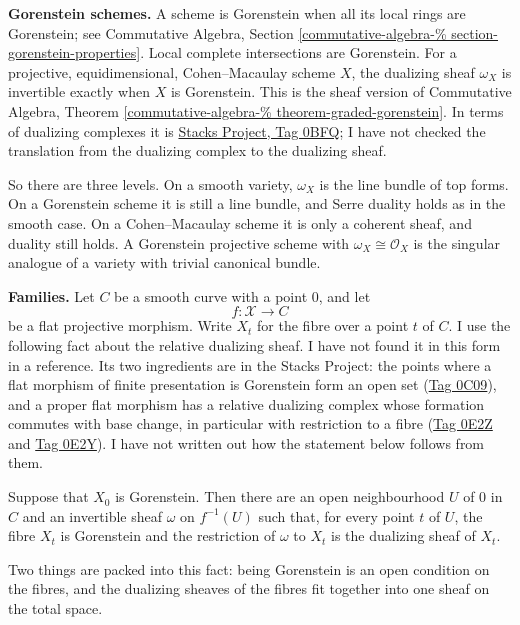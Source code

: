 \medskip\noindent
{\bf Gorenstein schemes.}
A scheme is Gorenstein when all its local
rings are Gorenstein; see Commutative
Algebra, Section
\ref{commutative-algebra-%
section-gorenstein-properties}. Local
complete intersections are Gorenstein.
For a projective, equidimensional,
Cohen--Macaulay scheme $X$, the dualizing
sheaf $\omega_X$ is invertible exactly
when $X$ is Gorenstein. This is the sheaf
version of Commutative Algebra, Theorem
\ref{commutative-algebra-%
theorem-graded-gorenstein}. In terms of
dualizing complexes it is
\href{https://stacks.math.columbia.edu/tag/0BFQ}
{Stacks Project, Tag 0BFQ}; I have not
checked the translation from the dualizing
complex to the dualizing sheaf.

So there are three levels. On a smooth
variety, $\omega_X$ is the line bundle of
top forms. On a Gorenstein scheme it is
still a line bundle, and Serre duality
holds as in the smooth case. On a
Cohen--Macaulay scheme it is only a
coherent sheaf, and duality still holds.
A Gorenstein projective scheme with
$\omega_X\cong\mathcal{O}_X$ is the
singular analogue of a variety with
trivial canonical bundle.

\medskip\noindent
{\bf Families.}
Let $C$ be a smooth curve with a point
$0$, and let
$$
f:\mathcal{X}\to C
$$
be a flat projective morphism. Write
$X_t$ for the fibre over a point $t$ of
$C$. I use the following fact about the
relative dualizing sheaf. I have not
found it in this form in a reference. Its
two ingredients are in the Stacks
Project: the points where a flat morphism
of finite presentation is Gorenstein form
an open set
(\href{https://stacks.math.columbia.edu/tag/0C09}
{Tag 0C09}), and a proper flat morphism has
a relative dualizing complex whose
formation commutes with base change, in
particular with restriction to a fibre
(\href{https://stacks.math.columbia.edu/tag/0E2Z}
{Tag 0E2Z} and
\href{https://stacks.math.columbia.edu/tag/0E2Y}
{Tag 0E2Y}). I have not written out how
the statement below follows from them.

Suppose that $X_0$ is Gorenstein. Then
there are an open neighbourhood $U$ of
$0$ in $C$ and an invertible sheaf
$\omega$ on $f^{-1}(U)$ such that, for
every point $t$ of $U$, the fibre $X_t$
is Gorenstein and the restriction of
$\omega$ to $X_t$ is the dualizing sheaf
of $X_t$.

Two things are packed into this fact:
being Gorenstein is an open condition on
the fibres, and the dualizing sheaves of
the fibres fit together into one sheaf on
the total space.


